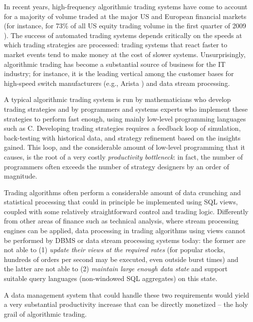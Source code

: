 

In recent years, high-frequency algorithmic trading systems have come to account for a majority
of volume traded at the major US and European financial markets (for instance,
for 73\% of all US equity trading volume in the first quarter of 2009
\cite{Iati2009}). The success of automated trading systems depends critically on
the speeds at which trading strategies are processed: trading systems that react faster to market events
tend to make money at the cost of slower systems. Unsurprisingly, algorithmic
trading has become a substantial source of business for the IT industry; for
instance, it is the leading vertical among the customer bases for high-speed
switch manufacturers (e.g., Arista \cite{Becht2010}) and data stream processing.




A typical algorithmic trading system is run by mathematicians who develop
trading strategies and by programmers and systems experts who implement these
strategies to perform fast enough, using mainly low-level programming languages
such as C. Developing trading strategies requires a feedback loop of simulation,
back-testing with historical data, and strategy refinement based on the insights
gained. This loop, and the considerable amount of low-level programming that it
causes, is the root of a very costly {\em productivity bottleneck}\/: in fact,
the number of programmers often exceeds the number of strategy designers by
an order of magnitude.


Trading algorithms often perform a considerable amount of data crunching
and statistical processing that could in principle be implemented using SQL
views, coupled with some relatively straightforward control and trading logic.
%
Differently from other areas of finance such as technical analysis,
where stream processing engines
\cite{abadi-vldbj:03,motwani-cidr:03} can be applied,
data processing in trading algorithms using views cannot be performed by DBMS or
data stream processing systems today: the former are not able to (1) {\em update
their views at the required rates}\/ (for popular stocks, hundreds of orders per
second may be executed, even outside burst times) and the latter are not able to
(2) {\em maintain large enough data state}\/ and support suitable query
languages (non-windowed SQL aggregates) on this state.

%
A data management system that could handle these two requirements would yield a
very substantial productivity increase that can be directly monetized -- the
holy grail of algorithmic trading.



